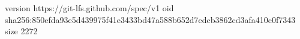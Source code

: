 version https://git-lfs.github.com/spec/v1
oid sha256:850efda93e5d439975f41e3433bd47a588b652d7edcb3862cd3afa410c0f7343
size 2272
